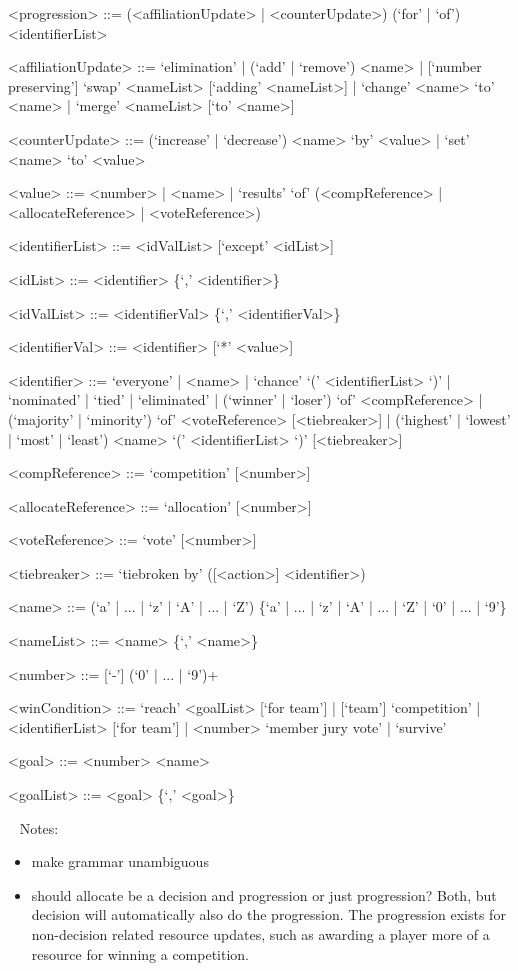 \documentclass{article}
\begin{document}
\begin{grammar}
<progression> ::= (<affiliationUpdate> | <counterUpdate>) (`for' | `of') 
<identifierList>

<affiliationUpdate> ::= `elimination' | (`add' | `remove') <name> | 
[`number preserving'] `swap' <nameList> [`adding' <nameList>] | `change' <name> 
`to' <name> | `merge' <nameList> [`to' <name>]

<counterUpdate> ::= (`increase' | `decrease') <name> `by' <value> | `set' 
<name> `to' <value> 

<value> ::= <number> | <name> | `results' `of' (<compReference> | 
<allocateReference> |
<voteReference>) %

<identifierList> ::= <idValList> [`except' <idList>]

<idList> ::= <identifier> \{`,' <identifier>\}

<idValList> ::= <identifierVal> \{`,' <identifierVal>\}

<identifierVal> ::= <identifier> [`*' <value>]

<identifier> ::= `everyone' | <name> | `chance' `(' <identifierList> `)' | 
`nominated' 
| 
`tied' | 
`eliminated' | (`winner' | `loser') `of' <compReference> | (`majority' | 
`minority') `of' <voteReference>  [<tiebreaker>] | (`highest' | `lowest' | 
`most' | `least') <name> `(' <identifierList> `)' [<tiebreaker>]

<compReference> ::= `competition' [<number>] 

<allocateReference> ::= `allocation' [<number>]

<voteReference> ::= `vote' [<number>]

<tiebreaker> ::= `tiebroken by' ([<action>] <identifier>)

<name> ::= (`a' | ... | `z' | `A' | ... | `Z') \{`a' | ... | `z' | `A' | ... | 
`Z' | `0' | ... | `9'\}

<nameList> ::= <name> \{`,' <name>\}

<number> ::= [`-'] (`0' | ... | `9')+

<winCondition> ::= `reach' <goalList> [`for team']  | [`team'] 
`competition' | <identifierList> [`for team'] | 
<number> `member jury vote' | `survive'

<goal> ::= <number> <name>

<goalList> ::= <goal> \{`,' <goal>\}

\end{grammar}

~\newline
Notes:
\begin{itemize}
	\item make grammar unambiguous
	\item should allocate be a decision and progression or just progression? 
	Both, but decision will automatically also do the progression. The 
	progression exists for non-decision related resource updates, such as 
	awarding a player more of a resource for winning a competition.
\end{itemize}
\end{document}
